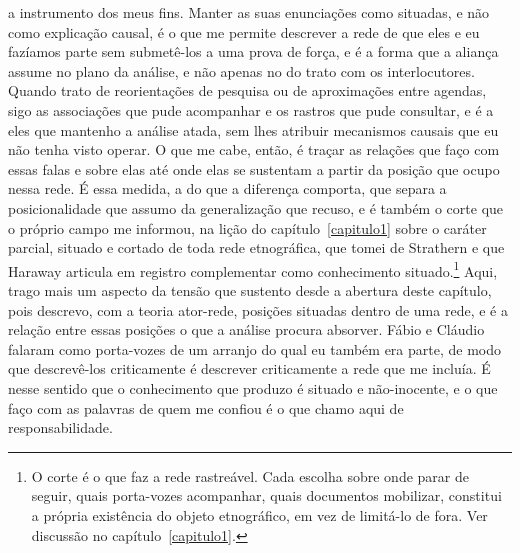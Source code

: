 a instrumento dos meus fins. Manter as suas enunciações como situadas, e não como explicação causal, é o que me permite descrever a rede de que eles e eu fazíamos parte sem submetê-los a uma prova de força, e é a forma que a aliança assume no plano da análise, e não apenas no do trato com os interlocutores. Quando trato de reorientações de pesquisa ou de aproximações entre agendas, sigo as associações que pude acompanhar e os rastros que pude consultar, e é a eles que mantenho a análise atada, sem lhes atribuir mecanismos causais que eu não tenha visto operar. O que me cabe, então, é traçar as relações que faço com essas falas e sobre elas até onde elas se sustentam a partir da posição que ocupo nessa rede. É essa medida, a do que a diferença comporta, que separa a posicionalidade que assumo da generalização que recuso, e é também o corte que o próprio campo me informou, na lição do capítulo~\ref{capitulo1} sobre o caráter parcial, situado e cortado de toda rede etnográfica, que tomei de Strathern \parencite{strathern2011cortando} e que Haraway articula em registro complementar como conhecimento situado.\footnote{O corte é o que faz a rede rastreável. Cada escolha sobre onde parar de seguir, quais porta-vozes acompanhar, quais documentos mobilizar, constitui a própria existência do objeto etnográfico, em vez de limitá-lo de fora. Ver discussão no capítulo~\ref{capitulo1}.} Aqui, trago mais um aspecto da tensão que sustento desde a abertura deste capítulo, pois descrevo, com a teoria ator-rede, posições situadas dentro de uma rede, e é a relação entre essas posições o que a análise procura absorver. Fábio e Cláudio falaram como porta-vozes de um arranjo do qual eu também era parte, de modo que descrevê-los criticamente é descrever criticamente a rede que me incluía. É nesse sentido que o conhecimento que produzo é situado e não-inocente, e o que faço com as palavras de quem me confiou é o que chamo aqui de responsabilidade.

